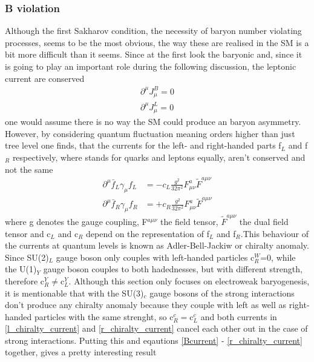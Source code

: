 \subsubsection{B violation}
Although the first Sakharov condition, the necessity of baryon number violating processes, seems to be the most obvious, the way these are realised in the SM is a bit more difficult than it seems. \newline
Since at the first look the baryonic and, since it is going to play an important role during the following discussion, the leptonic current are  conserved
\begin{align}
	\partial^\mu J_\mu^B=0
	\label{Bcurrent}
	\\
	\partial^\mu J_\mu^L=0
	\label{Lcurrent}
\end{align}
one would assume there is no way the SM could produce an baryon asymmetry. However, by considering quantum fluctuation meaning orders higher than just tree level one finds, that the currents for the left- and right-handed parts f$_L$ and f$_R$ respectively, where stands for quarks and leptons equally, aren't conserved and not the same \cite{Bernreuther:2002uj}
\begin{align}
	\partial^\mu\bar{f}_L\gamma_\mu f_L&=-c_L\frac{g^2}{32\pi^2}F^a_{\mu\nu}\tilde{F}^{a\mu\nu}
	\label{l_chiralty_current}
	\\
	\partial^\mu\bar{f}_R\gamma_\mu f_R&=+c_R\frac{g^2}{32\pi^2}F^a_{\mu\nu}\tilde{F}^{a\mu\nu}
	\label{r_chiralty_current}
\end{align}
where g denotes the gauge coupling, F$^{a\mu\nu}$ the field tensor, $\tilde{F}^{a\mu\nu}$ the dual field tensor and c$_L$ and c$_R$ depend on the representation of f$_L$ and f$_R$.This behaviour of the currents at quantum levels is known as Adler-Bell-Jackiw or chiralty anomaly. 
Since SU(2)$_L$ gauge boson only couples with left-handed particles c$_R^W$=0, while the U(1)$_Y$ gauge boson couples to both hadednesses, but with different strength, therefore c$_R^Y\neq$c$_L^Y$. Although this section only focuses on electroweak baryogenesis, it is mentionable that with the SU(3)$_c$ gauge bosons of the strong interactions don't produce any chiralty anomaly because they couple with left as well as right-handed particles with the same strenght, so c$_R^c=$c$_L^c$ and both currents in \eqref{l_chiralty_current} and \eqref{r_chiralty_current} cancel each other out in the case of strong interactions. \newline
Putting this and eqautions \ref{Bcurrent} - \ref{r_chiralty_current} together, gives a pretty interesting result
